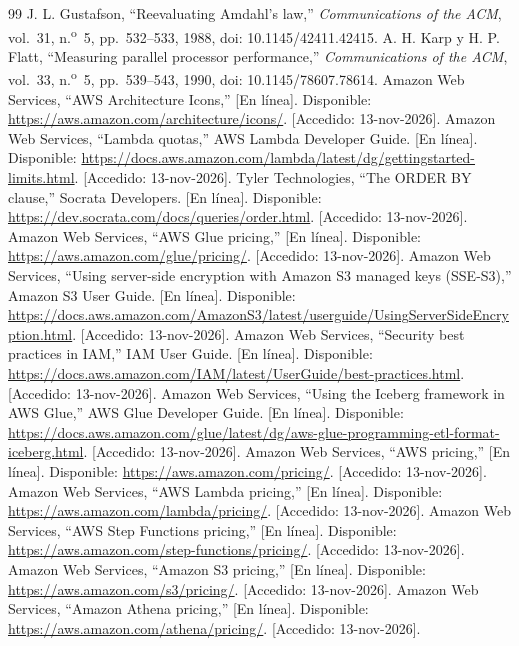 \begin{thebibliography}{99}
 J. L. Gustafson, ``Reevaluating Amdahl's law,'' \emph{Communications of the ACM}, vol.~31, n.\textsuperscript{o}~5, pp.~532--533, 1988, doi: 10.1145/42411.42415.
 A. H. Karp y H. P. Flatt, ``Measuring parallel processor performance,'' \emph{Communications of the ACM}, vol.~33, n.\textsuperscript{o}~5, pp.~539--543, 1990, doi: 10.1145/78607.78614.
 Amazon Web Services, ``AWS Architecture Icons,'' [En línea]. Disponible: \url{https://aws.amazon.com/architecture/icons/}. [Accedido: 13-nov-2026].
 Amazon Web Services, ``Lambda quotas,'' AWS Lambda Developer Guide. [En línea]. Disponible: \url{https://docs.aws.amazon.com/lambda/latest/dg/gettingstarted-limits.html}. [Accedido: 13-nov-2026].
 Tyler Technologies, ``The ORDER BY clause,'' Socrata Developers. [En línea]. Disponible: \url{https://dev.socrata.com/docs/queries/order.html}. [Accedido: 13-nov-2026].
 Amazon Web Services, ``AWS Glue pricing,'' [En línea]. Disponible: \url{https://aws.amazon.com/glue/pricing/}. [Accedido: 13-nov-2026].
 Amazon Web Services, ``Using server-side encryption with Amazon S3 managed keys (SSE-S3),'' Amazon S3 User Guide. [En línea]. Disponible: \url{https://docs.aws.amazon.com/AmazonS3/latest/userguide/UsingServerSideEncryption.html}. [Accedido: 13-nov-2026].
 Amazon Web Services, ``Security best practices in IAM,'' IAM User Guide. [En línea]. Disponible: \url{https://docs.aws.amazon.com/IAM/latest/UserGuide/best-practices.html}. [Accedido: 13-nov-2026].
 Amazon Web Services, ``Using the Iceberg framework in AWS Glue,'' AWS Glue Developer Guide. [En línea]. Disponible: \url{https://docs.aws.amazon.com/glue/latest/dg/aws-glue-programming-etl-format-iceberg.html}. [Accedido: 13-nov-2026].
 Amazon Web Services, ``AWS pricing,'' [En línea]. Disponible: \url{https://aws.amazon.com/pricing/}. [Accedido: 13-nov-2026].
 Amazon Web Services, ``AWS Lambda pricing,'' [En línea]. Disponible: \url{https://aws.amazon.com/lambda/pricing/}. [Accedido: 13-nov-2026].
 Amazon Web Services, ``AWS Step Functions pricing,'' [En línea]. Disponible: \url{https://aws.amazon.com/step-functions/pricing/}. [Accedido: 13-nov-2026].
 Amazon Web Services, ``Amazon S3 pricing,'' [En línea]. Disponible: \url{https://aws.amazon.com/s3/pricing/}. [Accedido: 13-nov-2026].
 Amazon Web Services, ``Amazon Athena pricing,'' [En línea]. Disponible: \url{https://aws.amazon.com/athena/pricing/}. [Accedido: 13-nov-2026].

\end{thebibliography}
